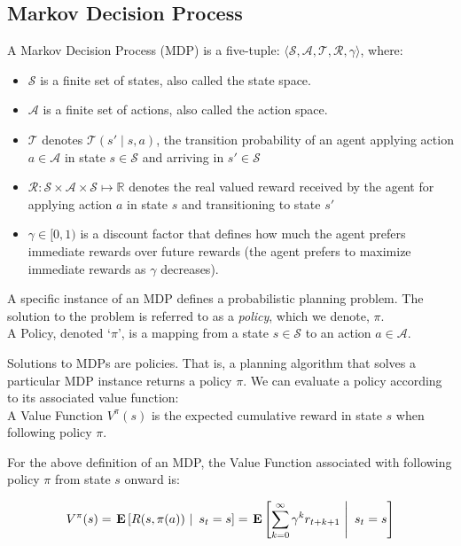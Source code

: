 \documentclass[11pt]{article}
\begin{document}
\subsection{Markov Decision Process}
{ A \textup{Markov Decision Process (MDP)} is a five-tuple: $\langle \mathcal{S},
\mathcal{A}, \mathcal{T}, \mathcal{R}, \gamma \rangle$, where:
\begin{itemize}
\item $\mathcal{S}$ is a finite set of states, also called the \textup{state space}.
\item $\mathcal{A}$ is a finite set of actions, also called the \textup{action space}.
\item $\mathcal{T}$ denotes $\mathcal{T}(s' \mid s,a)$, the
transition probability of an agent applying action $a \in \mathcal{A}$
in state $s \in \mathcal{S}$ and arriving in $s' \in \mathcal{S}$
\item $\mathcal{R} : \mathcal{S} \times \mathcal{A} \times \mathcal{S} \mapsto \mathbb{R}$ denotes the real valued reward received by the agent for
applying action $a$ in state $s$ and transitioning to state $s'$
\item $\gamma \in [0, 1)$ is a discount factor that defines how much the
  agent prefers immediate rewards over future rewards (the agent
  prefers to maximize immediate rewards as $\gamma$ decreases).
\end{itemize}}

A specific instance of an MDP defines a probabilistic planning problem. The solution to the problem is referred to as a {\it policy}, which we denote, $\pi$. \\

{ A \textup{Policy}, denoted `$\pi$', is a mapping from a state $s \in \mathcal{S}$ to an action $a \in \mathcal{A}$.}

Solutions to MDPs are policies. That is, a planning algorithm that solves a particular MDP instance returns a policy $\pi$. We can evaluate a policy according to its associated value function: \\

{ A \textup{Value Function} $V^\pi(s)$ is the expected cumulative reward in state $s$ when following policy $\pi$.}

For the above definition of an MDP, the Value Function associated with following policy $\pi$ from state $s$ onward is:

\begin{equation}
V^\pi(s) = \left.\E{R(s,\pi(a))\ \right|\ s_t = s} = \left.\E{\sum_{k=0}^\infty \gamma^k r_{t+k+1}\ \right|\ s_t = s}
\end{equation}
\end{document}
